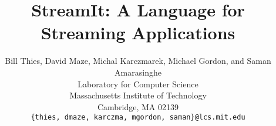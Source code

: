 \documentclass[psfig]{acm_proc_article-sp}
\begin{document}
\title{StreamIt: A Language for Streaming Applications}

\author{
\alignauthor \vspace{-18pt} Bill Thies, David Maze, Michal Karczmarek, Michael Gordon, and Saman Amarasinghe\\
	\vspace{12pt}
	Laboratory for Computer Science \\
	Massachusetts Institute of Technology \\
	Cambridge, MA  02139 \\
	\vspace{12pt}
	{\tt \{thies, dmaze, karczma, mgordon, saman\}@lcs.mit.edu} \\
	\vspace{-6pt}
}

\newcommand{\ma}[2]{max_{#1 \rightarrow #2}}
\newcommand{\mal}[1]{maxloop_{#1 \rightarrow #1}}
\newcommand{\mi}[2]{min_{#1 \leftarrow #2}}

\maketitle

\begin{abstract}

\end{abstract}




%





%

\end{document}
